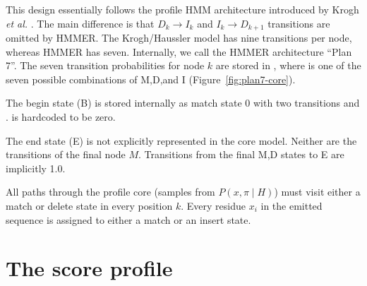 This design essentially follows the profile HMM architecture
introduced by Krogh \emph{et al.}  \citep{Krogh94}. The main
difference is that $D_k \rightarrow I_k$ and $I_k \rightarrow D_{k+1}$
transitions are omitted by HMMER. The Krogh/Haussler model has nine
transitions per node, whereas HMMER has seven. Internally, we call the
HMMER architecture ``Plan 7''. The seven transition probabilities for
node $k$ are stored in , where  is one
of the seven possible combinations of M,D,and I
(Figure~\ref{fig:plan7-core}).

The begin state (B) is stored internally as match state 0 with two
transitions  and
.  is hardcoded to be zero.

The end state (E) is not explicitly represented in the core model.
Neither are the transitions of the final node $M$.  Transitions from
the final M,D states to E are implicitly 1.0.

All paths through the profile core (samples from $P(x, \pi \mid H)$)
must visit either a match or delete state in every position $k$.
Every residue $x_i$ in the emitted sequence is assigned to either a
match or an insert state.


%
\section{The score profile}
%

